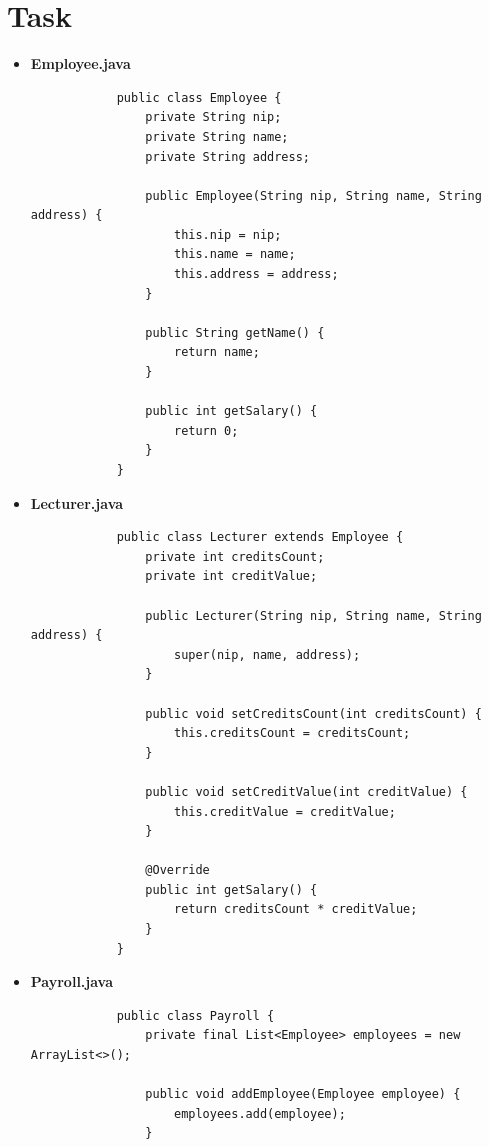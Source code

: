 \documentclass[12pt,titlepage]{article}
\begin{document}
\section{Task}
\begin{itemize}
    \item {
        \textbf{Employee.java}
        \begin{verbatim}
            public class Employee {
                private String nip;
                private String name;
                private String address;

                public Employee(String nip, String name, String address) {
                    this.nip = nip;
                    this.name = name;
                    this.address = address;
                }

                public String getName() {
                    return name;
                }

                public int getSalary() {
                    return 0;
                }
            }
        \end{verbatim}
    }
    \item {
        \textbf{Lecturer.java}
        \begin{verbatim}
            public class Lecturer extends Employee {
                private int creditsCount;
                private int creditValue;

                public Lecturer(String nip, String name, String address) {
                    super(nip, name, address);
                }

                public void setCreditsCount(int creditsCount) {
                    this.creditsCount = creditsCount;
                }

                public void setCreditValue(int creditValue) {
                    this.creditValue = creditValue;
                }

                @Override
                public int getSalary() {
                    return creditsCount * creditValue;
                }
            }
        \end{verbatim}
    }
    \item {
        \textbf{Payroll.java}
        \begin{verbatim}
            public class Payroll {
                private final List<Employee> employees = new ArrayList<>();

                public void addEmployee(Employee employee) {
                    employees.add(employee);
                }


\end{verbatim}}
\end{itemize}
\end{document}
